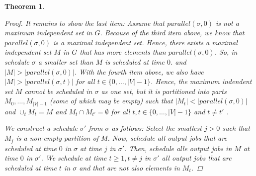 \documentclass{article}
\newtheorem{mythm}{Theorem}
\begin{document}
\begin{mythm}
\begin{proof}
It remains to show the last item:  
Assume that ${parallel}(\sigma, 0)$ is not a maximum independent set in $G$. Because of the third item above, we know that ${parallel}(\sigma, 0)$ is a maximal independent set. Hence, there exists a maximal independent set $M$ in $G$ that has more elements than ${parallel}(\sigma, 0)$.  So, in schedule $\sigma$ a smaller set than $M$ is scheduled at time $0$. and  $ |M| > |{parallel}(\sigma, 0)|$. With the fourth item above, we also have $|M| > |{parallel}(\sigma, t)|$ for all $t \in \{0, \ldots, |V| -1 \}$. Hence, the maximum indendent set $M$ cannot be scheduled in $\sigma$  as one set, but it is partitioned into parts $M_0,\ldots, M_{|V|-1}$ (some of which may be empty) such that $|M_t| < |{parallel}(\sigma, 0)|$ and $\cup_t M_t = M$ and $M_t \cap M_{t'} = \emptyset$ for all $t, t \in \{0, \ldots, |V| -1\}$ and $t \not= t'$ . 


We construct a schedule $\sigma'$ from $\sigma$ as follows: Select the smallest $j > 0$  such that $M_j$  is a non-empty partition of $M$.  Now, schedule all output jobs that are scheduled at time $0$ in $\sigma$ at time $j$ in $\sigma'$. Then,  schedule alle output jobs in $M$ at time $0$ in $\sigma'$. We schedule at time $t \geq 1, t \not= j$ in $\sigma'$ all output jobs that are scheduled at time $t$ in $\sigma$ and that are not also elements in $M_t$. 


\end{proof}
\end{mythm}
\end{document}
